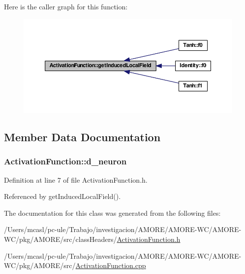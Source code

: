 Here is the caller graph for this function:
\nopagebreak
\begin{figure}[H]
\begin{center}
\leavevmode
\includegraphics[width=390pt]{class_activation_function_a72f5e70051e79c0e19318ba1b9bb77ec_icgraph}
\end{center}
\end{figure}




\subsection{Member Data Documentation}
\hypertarget{class_activation_function_ae58cc9df29759bbc76816ebfd68e2084}{
\subsubsection[{d\_\-neuron}]{ {\bf ActivationFunction::d\_\-neuron}}}
\label{class_activation_function_ae58cc9df29759bbc76816ebfd68e2084}


Definition at line 7 of file ActivationFunction.h.



Referenced by getInducedLocalField().



The documentation for this class was generated from the following files:\begin{DoxyCompactItemize}
\item 
/Users/mcasl/pc-\/ule/Trabajo/investigacion/AMORE/AMORE-\/WC/AMORE-\/WC/pkg/AMORE/src/classHeaders/\hyperlink{_activation_function_8h}{ActivationFunction.h}\item 
/Users/mcasl/pc-\/ule/Trabajo/investigacion/AMORE/AMORE-\/WC/AMORE-\/WC/pkg/AMORE/src/\hyperlink{_activation_function_8cpp}{ActivationFunction.cpp}\end{DoxyCompactItemize}
